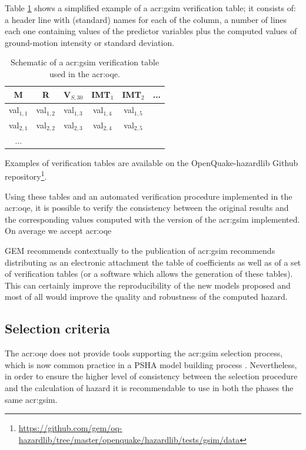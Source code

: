 Table \ref{tab:verification} shows a simplified example of a 
\gls{acr:gsim} verification table; it consists of: a header 
line with (standard) names for each of the column, a number
of lines each one containing values of the predictor variables
plus the computed values of ground-motion intensity or standard
deviation.
\begin{table}[!ht]
\centering
\begin{tabular}{|cccccc|}
\hline
\rowcolor{anti-flashwhite}
M & R & V$_{S,30}$ & IMT$_1$ & IMT$_2$ & ... \\
\hline 
val$_{1,1}$ & val$_{1,2}$ & val$_{1,3}$ & val$_{1,4}$ & val$_{1,5}$ & \\
val$_{2,1}$ & val$_{2,2}$ & val$_{2,3}$ & val$_{2,4}$ & val$_{2,5}$ & \\
... & & & & & \\
\hline
\end{tabular}
\caption{Schematic of a \gls{acr:gsim} verification table used in the 
\gls{acr:oqe}.}
\label{tab:verification}
\end{table}
Examples of verification tables are available on the OpenQuake-hazardlib Github
repository\footnote{
\href{https://github.com/gem/oq-hazardlib/tree/master/openquake/hazardlib/tests/gsim/data}{
https://github.com/gem/oq-hazardlib/tree/master/openquake/hazardlib/tests/gsim/data}
}.

Using these tables and an automated verification procedure implemented
in the \gls{acr:oqe}, it is possible to verify the consistency between 
the original results and the corresponding values computed with the 
version of the \gls{acr:gsim} implemented. 
%
On average we accept \gls{acr:oqe}

GEM recommends contextually to the publication of \gls{acr:gsim} recommends
distributing as an electronic attachment the table of coefficients as well 
as of a set of verification tables (or a software which allows the generation 
of these tables). This can certainly improve the reproducibility of the 
new models proposed and most of all would improve the quality and 
robustness of the computed hazard.
%
\subsection{Selection criteria}
The \gls{acr:oqe} does not provide tools supporting the \gls{acr:gsim}
selection process, which is now common practice in a PSHA model building 
process \parencite[see for example][]{delavaud2012}. Nevertheless, in order 
to ensure the higher level of consistency between the selection procedure and
the calculation of hazard it is recommendable to use in both the phases the 
same \gls{acr:gsim}. 

